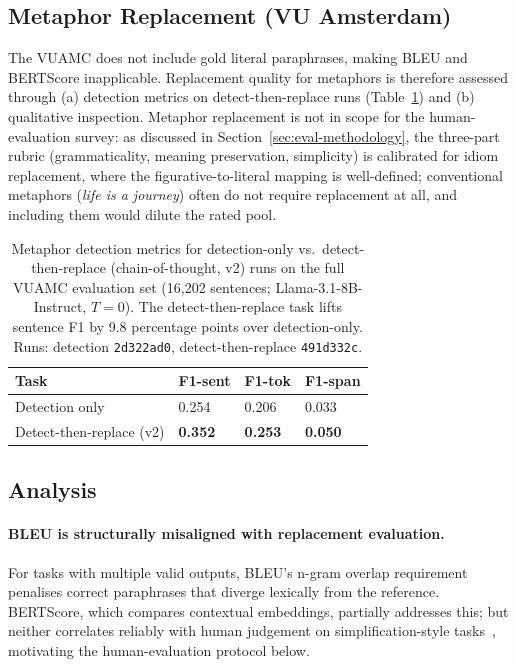 \subsection{Metaphor Replacement (VU Amsterdam)}

The VUAMC does not include gold literal paraphrases, making BLEU and BERTScore inapplicable. Replacement quality for metaphors is therefore assessed through (a) detection metrics on detect-then-replace runs (Table~\ref{tab:rq3-vu}) and (b) qualitative inspection. Metaphor replacement is not in scope for the human-evaluation survey: as discussed in Section~\ref{sec:eval-methodology}, the three-part rubric (grammaticality, meaning preservation, simplicity) is calibrated for idiom replacement, where the figurative-to-literal mapping is well-defined; conventional metaphors (\textit{life is a journey}) often do not require replacement at all, and including them would dilute the rated pool.

\begin{table}[h!]
\centering
\begin{tabular}{llll}
\hline
\textbf{Task} & \textbf{F1-sent} & \textbf{F1-tok} & \textbf{F1-span} \\
\hline
Detection only            & 0.254 & 0.206 & 0.033 \\
Detect-then-replace (v2)  & \textbf{0.352} & \textbf{0.253} & \textbf{0.050} \\
\hline
\end{tabular}
\caption{Metaphor detection metrics for detection-only vs.\ detect-then-replace (chain-of-thought, v2) runs on the full VUAMC evaluation set (16{,}202 sentences; Llama-3.1-8B-Instruct, $T=0$). The detect-then-replace task lifts sentence F1 by 9.8 percentage points over detection-only. Runs: detection \texttt{2d322ad0}, detect-then-replace \texttt{491d332c}.}
\label{tab:rq3-vu}
\end{table}

\subsection{Analysis}

\paragraph{BLEU is structurally misaligned with replacement evaluation.} For tasks with multiple valid outputs, BLEU's n-gram overlap requirement penalises correct paraphrases that diverge lexically from the reference. BERTScore, which compares contextual embeddings, partially addresses this; but neither correlates reliably with human judgement on simplification-style tasks~\cite{Alva-Manchego2021,Scialom2021}, motivating the human-evaluation protocol below.

